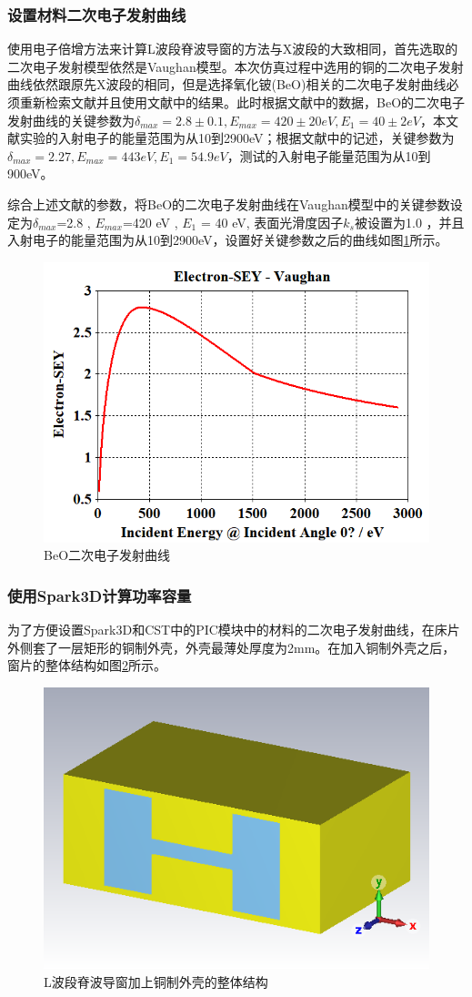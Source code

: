 \documentclass[master]{thesis-uestc}
\begin{document}
\subsubsection{设置材料二次电子发射曲线}
使用电子倍增方法来计算L波段脊波导窗的方法与X波段的大致相同，首先选取的二次电子发射模型依然是Vaughan模型。本次仿真过程中选用的铜的二次电子发射曲线依然跟原先X波段的相同，但是选择氧化铍(BeO)相关的二次电子发射曲线必须重新检索文献并且使用文献中的结果。此时根据文献\cite{shih_1994_beosee}中的数据，BeO的二次电子发射曲线的关键参数为$\delta_{max}=2.8 \pm 0.1, E_{max}=420 \pm 20 eV, E_1 = 40 \pm 2 eV$，本文献实验的入射电子的能量范围为从10到2900eV；根据文献\cite{ritz_1988_secondary}中的记述，关键参数为$\delta_{max}=2.27, E_{max}= 443  eV, E_1 =54.9 eV$，测试的入射电子能量范围为从10到900eV。

综合上述文献的参数，将BeO的二次电子发射曲线在Vaughan模型中的关键参数设定为$\delta_{max}$=2.8 , $E_{max}$=420 eV , $E_1$ = 40 eV, 表面光滑度因子\(k_s\)被设置为1.0 ，并且入射电子的能量范围为从10到2900eV，设置好关键参数之后的曲线如图\ref{fig:BeO二次电子发射曲线}所示。
\begin{figure}[!htb]
    \centering
    \includegraphics[width=0.5\linewidth]{pic/chapter4/BeO二次电子发射曲线.png}
    \caption{BeO二次电子发射曲线}
    \label{fig:BeO二次电子发射曲线}
\end{figure}

\subsubsection{使用Spark3D计算功率容量}
为了方便设置Spark3D和CST中的PIC模块中的材料的二次电子发射曲线，在床片外侧套了一层矩形的铜制外壳，外壳最薄处厚度为2mm。在加入铜制外壳之后，窗片的整体结构如图\ref{fig:L波段加上铜制外壳}所示。

\begin{figure}[!htb]
    \centering
    \includegraphics[width=0.3\linewidth]{pic/chapter4/L波段加上铜制外壳.png}
    \caption{L波段脊波导窗加上铜制外壳的整体结构}
    \label{fig:L波段加上铜制外壳}
\end{figure}
\end{document}
